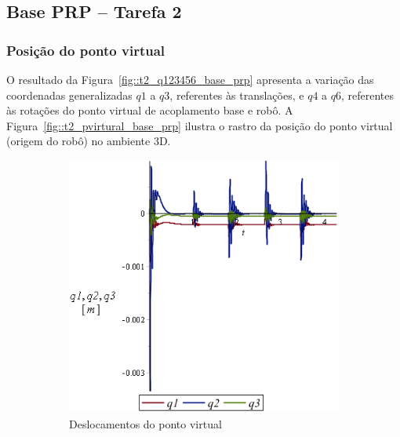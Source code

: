 \subsection{Base PRP -- Tarefa 2}

\subsubsection{Posição do ponto virtual}

O resultado da Figura~\ref{fig::t2_q123456_base_prp} apresenta a variação das
coordenadas generalizadas $q1$ a $q3$, referentes às translações, e $q4$ a $q6$,
referentes às rotações do ponto virtual de acoplamento base e robô. A
Figura~\ref{fig::t2_pvirtural_base_prp} ilustra o rastro da posição do ponto
virtual (origem do robô) no ambiente 3D.

\begin{figure}[h]
    \centering
    \begin{subfigure}[b]{0.48\textwidth}
        \includegraphics[width=\textwidth]{figs/t2_q123_base_prp}
        \caption{Deslocamentos do ponto virtual}
        \label{fig::t2_q123_base_prp}
    \end{subfigure}
    \quad %
    \begin{subfigure}[b]{0.48\textwidth}

\end{subfigure}
\end{figure}
